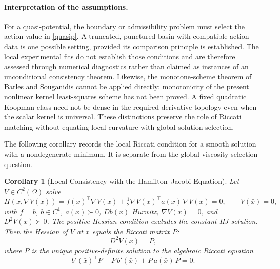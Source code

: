 \documentclass[11pt]{article}
\theoremstyle{plain}      %
\newtheorem{corollary}[theorem]{Corollary}
\theoremstyle{definition} %
\begin{document}
\paragraph{Interpretation of the assumptions.}
For a quasi-potential, the boundary or admissibility problem must select the action value in \eqref{quasip}. A truncated, punctured basin with compatible action data is one possible setting, provided its comparison principle is established. The local experimental fits do not establish those conditions and are therefore assessed through numerical diagnostics rather than claimed as instances of an unconditional consistency theorem. Likewise, the monotone-scheme theorem of Barles and Souganidis \cite{Barles1991} cannot be applied directly: monotonicity of the present nonlinear kernel least-squares scheme has not been proved. A fixed quadratic Koopman class need not be dense in the required derivative topology even when the scalar kernel is universal. These distinctions preserve the role of Riccati matching without equating local curvature with global solution selection.

The following corollary records the local Riccati condition for a smooth solution with a nondegenerate minimum. It is separate from the global viscosity-selection question.

\begin{corollary}[Local Consistency with the Hamilton--Jacobi Equation]\label{cor:localHJ}
Let $V \in C^{2}(\Omega)$ solve
\[
H(x,\nabla V(x))
=f(x)^\top \nabla V(x)
+\tfrac{1}{2}\nabla V(x)^\top a(x)\,\nabla V(x)=0,
\qquad V(\bar{x})=0,
\]
with $f=b$, $b\in C^1$, $a(\bar x)\succ0$, $Db(\bar x)$ Hurwitz, $\nabla V(\bar x)=0$, and $D^2V(\bar x)\succ0$. The positive-Hessian condition excludes the constant HJ solution.
Then the Hessian of $V$ at $\bar{x}$ equals the Riccati matrix $P$:
\[
D^{2}V(\bar{x})=P,
\]
where $P$ is the unique positive-definite solution to the algebraic Riccati equation
\[
b'(\bar{x})^\top P + P\,b'(\bar{x}) + P\,a(\bar{x})\,P=0.
\]
\end{corollary}
\end{document}
